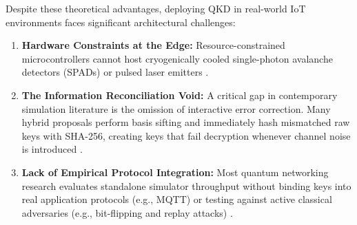 \documentclass[journal,10pt,twocolumn]{article}
\begin{document}
Despite these theoretical advantages, deploying QKD in real-world IoT environments faces significant architectural challenges:
\begin{enumerate}
    \item \textbf{Hardware Constraints at the Edge:} Resource-constrained microcontrollers cannot host cryogenically cooled single-photon avalanche detectors (SPADs) or pulsed laser emitters \cite{kaganurmath2025dlks}.
    \item \textbf{The Information Reconciliation Void:} A critical gap in contemporary simulation literature is the omission of interactive error correction. Many hybrid proposals perform basis sifting and immediately hash mismatched raw keys with SHA-256, creating keys that fail decryption whenever channel noise is introduced \cite{farooq2024enhanced, buyukdede2026virtualized}.
    \item \textbf{Lack of Empirical Protocol Integration:} Most quantum networking research evaluates standalone simulator throughput without binding keys into real application protocols (e.g., MQTT) or testing against active classical adversaries (e.g., bit-flipping and replay attacks) \cite{mallick2026systematic}.
\end{enumerate}
\end{document}
